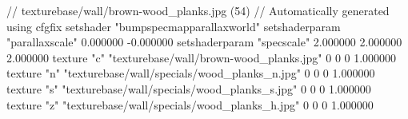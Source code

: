// texturebase/wall/brown-wood_planks.jpg (54)
// Automatically generated using cfgfix
setshader "bumpspecmapparallaxworld"
setshaderparam "parallaxscale" 0.000000 -0.000000
setshaderparam "specscale" 2.000000 2.000000 2.000000
texture "c" "texturebase/wall/brown-wood_planks.jpg" 0 0 0 1.000000
texture "n" "texturebase/wall/specials/wood_planks_n.jpg" 0 0 0 1.000000
texture "s" "texturebase/wall/specials/wood_planks_s.jpg" 0 0 0 1.000000
texture "z" "texturebase/wall/specials/wood_planks_h.jpg" 0 0 0 1.000000
